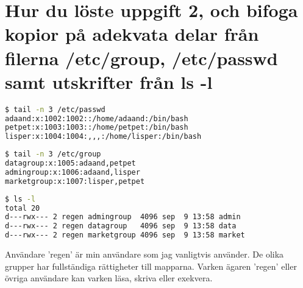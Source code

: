 \documentclass[11pt]{article}
\begin{document}
\pagebreak

\section{Hur du löste uppgift 2, och bifoga kopior på adekvata delar från filerna /etc/group, /etc/passwd samt utskrifter från ls -l}

\begin{lstlisting}[language=bash,caption={Utdrag från /etc/passwd}]
$ tail -n 3 /etc/passwd
adaand:x:1002:1002::/home/adaand:/bin/bash
petpet:x:1003:1003::/home/petpet:/bin/bash
lisper:x:1004:1004:,,,:/home/lisper:/bin/bash
\end{lstlisting}


\begin{lstlisting}[language=bash,caption={Utdrag från /etc/group}]
$ tail -n 3 /etc/group
datagroup:x:1005:adaand,petpet
admingroup:x:1006:adaand,lisper
marketgroup:x:1007:lisper,petpet
\end{lstlisting}

\begin{lstlisting}[language=bash,caption={Resultat av ls -l}]
$ ls -l
total 20
d---rwx--- 2 regen admingroup  4096 sep  9 13:58 admin
d---rwx--- 2 regen datagroup   4096 sep  9 13:58 data
d---rwx--- 2 regen marketgroup 4096 sep  9 13:58 market
\end{lstlisting}

Användare 'regen' är min användare som jag vanligtvis använder. De olika grupper har fullständiga rättigheter till mapparna. Varken ägaren 'regen' eller övriga användare kan varken läsa, skriva eller exekvera.
     
\end{document}
